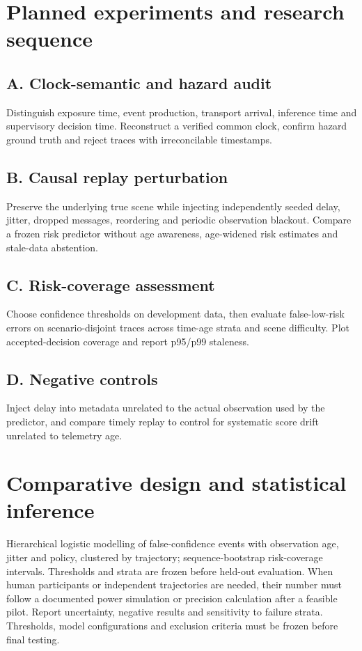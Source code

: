 \documentclass[11pt,a4paper]{article}
\begin{document}
\section{Planned experiments and research sequence}
\subsection{A. Clock-semantic and hazard audit}
Distinguish exposure time, event production, transport arrival, inference time and supervisory decision time. Reconstruct a verified common clock, confirm hazard ground truth and reject traces with irreconcilable timestamps.

\subsection{B. Causal replay perturbation}
Preserve the underlying true scene while injecting independently seeded delay, jitter, dropped messages, reordering and periodic observation blackout. Compare a frozen risk predictor without age awareness, age-widened risk estimates and stale-data abstention.

\subsection{C. Risk-coverage assessment}
Choose confidence thresholds on development data, then evaluate false-low-risk errors on scenario-disjoint traces across time-age strata and scene difficulty. Plot accepted-decision coverage and report p95/p99 staleness.

\subsection{D. Negative controls}
Inject delay into metadata unrelated to the actual observation used by the predictor, and compare timely replay to control for systematic score drift unrelated to telemetry age.

\section{Comparative design and statistical inference}
Hierarchical logistic modelling of false-confidence events with observation age, jitter and policy, clustered by trajectory; sequence-bootstrap risk-coverage intervals. Thresholds and strata are frozen before held-out evaluation. When human participants or independent trajectories are needed, their number must follow a documented power simulation or precision calculation after a feasible pilot. Report uncertainty, negative results and sensitivity to failure strata. Thresholds, model configurations and exclusion criteria must be frozen before final testing.
\end{document}

